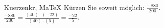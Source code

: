 \begin{MAufgabe}{Kuerzen}{kr, MaTeX}
K\"urzen Sie soweit m\"oglich: $\frac{-880}{200}$.\\ 
\ifLsg\MLoesung
\quad $\frac{-880}{200}=\frac{(40)\cdot(-22)}{(40)\cdot(5)}=\frac{-22}{5}$.\else\relax\fi
 \end{MAufgabe}